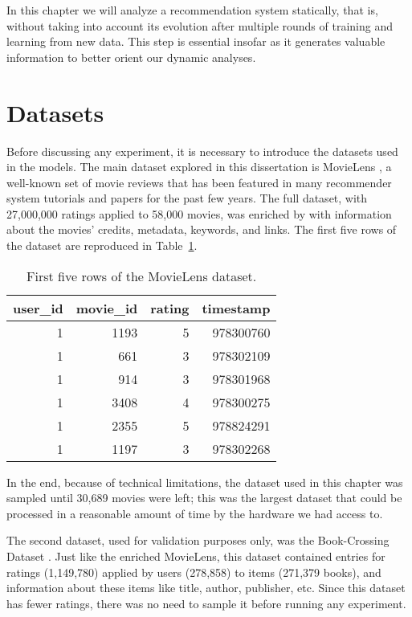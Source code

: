 In this chapter we will analyze a recommendation system statically, that is,
without taking into account its evolution after multiple rounds of training and
learning from new data. This step is essential insofar as it generates valuable
information to better orient our dynamic analyses.

\section{Datasets}
\label{sec:datasets03}

Before discussing any experiment, it is necessary to introduce the datasets used
in the models. The main dataset explored in this dissertation is MovieLens
\citep{harper_movielens_2015}, a well-known set of movie reviews that has been
featured in many recommender system tutorials and papers for the past few years.
The full dataset, with 27,000,000 ratings applied to 58,000 movies, was enriched
by \citet{banik_movies_2017} with information about the movies' credits,
metadata, keywords, and links. The first five rows of the dataset are reproduced
in Table~\ref{tab:tab03_head}.

\begin{table}[h]
  \begin{tabular}{ |r|r|r|r| }
    \hline
    user\_id & movie\_id & rating & timestamp\\
    \hline
    1 & 1193 & 5 & 978300760\\
    \hline
    1 & 661 & 3 & 978302109\\
    \hline
    1 & 914 & 3 & 978301968\\
    \hline
    1 & 3408 & 4 & 978300275\\
    \hline
    1 & 2355 & 5 & 978824291\\
    \hline
    1 & 1197 & 3 & 978302268\\
    \hline
  \end{tabular}

  \caption{First five rows of the MovieLens dataset.}
  \label{tab:tab03_head}
\end{table}

In the end, because of technical limitations, the dataset used in this chapter
was sampled until 30,689 movies were left; this was the largest dataset that
could be processed in a reasonable amount of time by the hardware we had access
to.

The second dataset, used for validation purposes only, was the Book-Crossing
Dataset \citep{ziegler_book-crossing_2004}. Just like the enriched MovieLens,
this dataset contained entries for ratings (1,149,780) applied by users
(278,858) to items (271,379 books), and information about these items like
title, author, publisher, etc. Since this dataset has fewer ratings, there was
no need to sample it before running any experiment.

